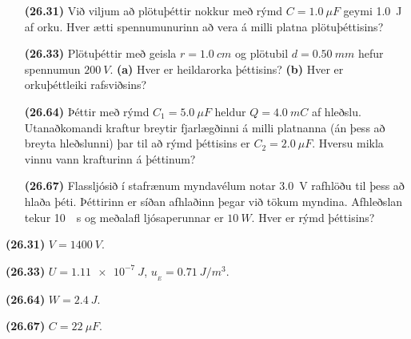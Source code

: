 \ifdefined \wholebook \else\documentclass[oneside]{book}\usepackage{EdlBook}\graphicspath{{figures/}}
\begin{document}
\begin{enumerate}[label = \textbf{(\alph*)}]

\item[\textbf{(26.31)}] Við viljum að plötuþéttir nokkur með rýmd $C = \SI{1.0}{\mu F}$ geymi \SI{1.0}{J} af orku. Hver ætti spennumunurinn að vera á milli platna plötuþéttisins?

\item[\textbf{(26.33)}] Plötuþéttir með geisla $r = \SI{1.0}{cm}$ og plötubil $d = \SI{0.50}{mm}$ hefur spennumun $\SI{200}{V}$. \textbf{(a)} Hver er heildarorka þéttisins? \textbf{(b)} Hver er orkuþéttleiki rafsviðsins?

\item[\textbf{(26.64)}] Þéttir með rýmd $C_1 = \SI{5.0}{\mu F}$ heldur $Q = \SI{4.0}{mC}$ af hleðslu. Utanaðkomandi kraftur breytir fjarlægðinni á milli platnanna (án þess að breyta hleðslunni) þar til að rýmd þéttisins er $C_2 = \SI{2.0}{\mu F}$. Hversu mikla vinnu vann krafturinn á þéttinum?

\item[\textbf{(26.67)}] Flassljósið í stafrænum myndavélum notar \SI{3.0}{V} rafhlöðu til þess að hlaða þéti. Þéttirinn er síðan afhlaðinn þegar við tökum myndina. Afhleðslan tekur \SI{10}{\mu s} og meðalafl ljósaperunnar er $\SI{10}{W}$. Hver er rýmd þéttisins?


\end{enumerate}

\begin{tcolorbox}
\begin{enumerate*}[label = \vspace{0.15cm} ]
  \item \textbf{(26.31)} $V = \SI{1400}{V}$.
  \item \textbf{(26.33)} $U = \SI{1.11e-7}{J}$, $u_{\!_E} = \SI{0.71}{J/m^3}$.
  \item \textbf{(26.64)} $W = \SI{2.4}{J}$. \\
  \item \textbf{(26.67)} $C = \SI{22}{\mu F}$.
\end{enumerate*}
\end{tcolorbox}

\newpage




\ifdefined \wholebook \else
 \printindex
\end{document}
